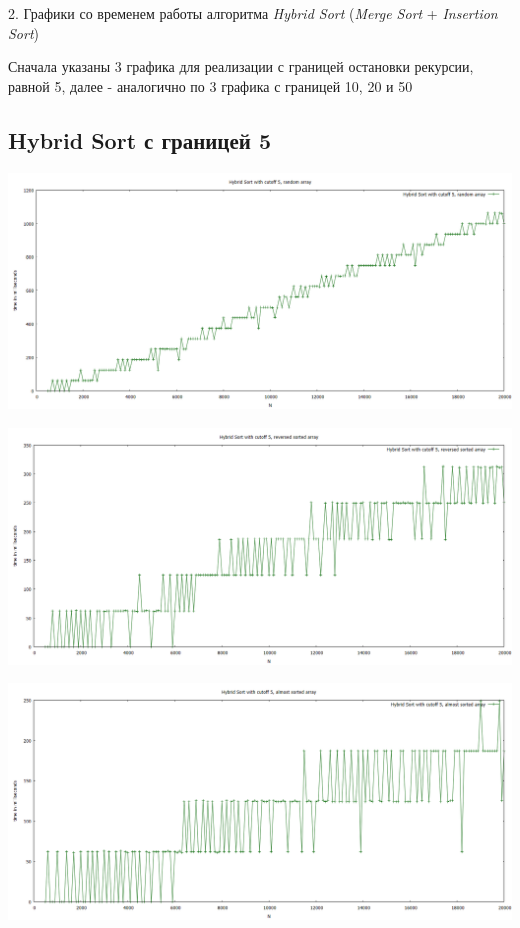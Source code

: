 \documentclass[11pt,a4paper]{article}
\begin{document}
\pagebreak

2. Графики со временем работы алгоритма \textit{Hybrid Sort} (\textit{Merge Sort} + \textit{Insertion Sort})

Сначала указаны 3 графика для реализации с границей остановки рекурсии, равной 5, далее - аналогично по 3 графика с границей 10, 20 и 50

\subsection*{Hybrid Sort с границей 5}

\hspace*{-2cm} \includegraphics[scale=0.5]{hybrid_sort_5_random_data.PNG}

\hspace*{-2cm} \includegraphics[scale=0.5]{hybrid_sort_5_reversed_sorted_data.PNG}

\hspace*{-2cm} \includegraphics[scale=0.5]{hybrid_sort_5_almost_sorted_data.PNG}
\end{document}
